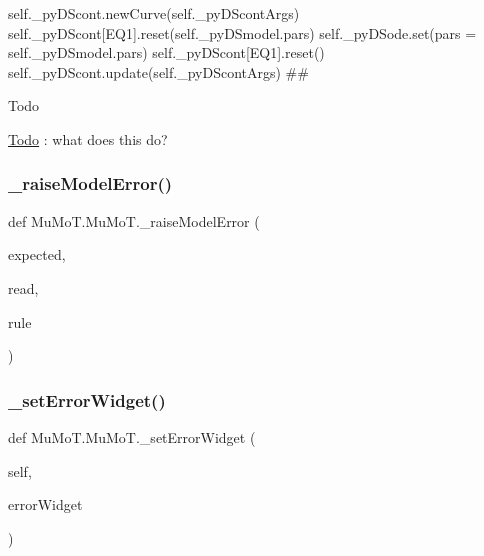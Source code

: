 self.\+\_\+py\+D\+Scont.\+new\+Curve(self.\+\_\+py\+D\+Scont\+Args) self.\+\_\+py\+D\+Scont\mbox{[}\textquotesingle{}E\+Q1\textquotesingle{}\mbox{]}.reset(self.\+\_\+py\+D\+Smodel.\+pars) self.\+\_\+py\+D\+Sode.\+set(pars = self.\+\_\+py\+D\+Smodel.\+pars) self.\+\_\+py\+D\+Scont\mbox{[}\textquotesingle{}E\+Q1\textquotesingle{}\mbox{]}.reset() self.\+\_\+py\+D\+Scont.\+update(self.\+\_\+py\+D\+Scont\+Args) \#\# 

\begin{DoxyRefDesc}{Todo}
\item[\hyperlink{todo__todo000004}{Todo}]\+: what does this do? \end{DoxyRefDesc}
\mbox{\label{namespace_mu_mo_t_1_1_mu_mo_t_a63a6213e268cff48055b330d7dd9e272}} 
\subsubsection{\texorpdfstring{\+\_\+raise\+Model\+Error()}{\_raiseModelError()}}
{\footnotesize\ttfamily def Mu\+Mo\+T.\+Mu\+Mo\+T.\+\_\+raise\+Model\+Error (\begin{DoxyParamCaption}\item[{}]{expected,  }\item[{}]{read,  }\item[{}]{rule }\end{DoxyParamCaption})\hspace{0.3cm}{\ttfamily [private]}}

\mbox{\label{namespace_mu_mo_t_1_1_mu_mo_t_aeed5088d916518ff1211a12ffe7da89a}} 
\subsubsection{\texorpdfstring{\+\_\+set\+Error\+Widget()}{\_setErrorWidget()}}
{\footnotesize\ttfamily def Mu\+Mo\+T.\+Mu\+Mo\+T.\+\_\+set\+Error\+Widget (\begin{DoxyParamCaption}\item[{}]{self,  }\item[{}]{error\+Widget }\end{DoxyParamCaption})\hspace{0.3cm}{\ttfamily [private]}}

